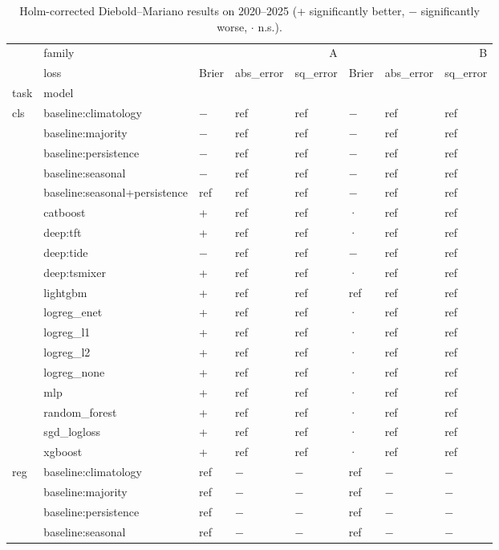 \begin{table}
\caption{Holm-corrected Diebold--Mariano results on 2020--2025 (+ significantly better, $-$ significantly worse, $\cdot$ n.s.).}
\label{tab:test_matrix}
\begin{tabular}{llllllll}
\toprule
 & family & \multicolumn{3}{r}{A} & \multicolumn{3}{r}{B} \\
 & loss & Brier & abs\_error & sq\_error & Brier & abs\_error & sq\_error \\
task & model &  &  &  &  &  &  \\
\midrule
\multirow[t]{18}{*}{cls} & baseline:climatology & − & ref & ref & − & ref & ref \\
 & baseline:majority & − & ref & ref & − & ref & ref \\
 & baseline:persistence & − & ref & ref & − & ref & ref \\
 & baseline:seasonal & − & ref & ref & − & ref & ref \\
 & baseline:seasonal+persistence & ref & ref & ref & − & ref & ref \\
 & catboost & + & ref & ref & · & ref & ref \\
 & deep:tft & + & ref & ref & · & ref & ref \\
 & deep:tide & − & ref & ref & − & ref & ref \\
 & deep:tsmixer & + & ref & ref & · & ref & ref \\
 & lightgbm & + & ref & ref & ref & ref & ref \\
 & logreg\_enet & + & ref & ref & · & ref & ref \\
 & logreg\_l1 & + & ref & ref & · & ref & ref \\
 & logreg\_l2 & + & ref & ref & · & ref & ref \\
 & logreg\_none & + & ref & ref & · & ref & ref \\
 & mlp & + & ref & ref & · & ref & ref \\
 & random\_forest & + & ref & ref & · & ref & ref \\
 & sgd\_logloss & + & ref & ref & · & ref & ref \\
 & xgboost & + & ref & ref & · & ref & ref \\
\cline{1-8}
\multirow[t]{20}{*}{reg} & baseline:climatology & ref & − & − & ref & − & − \\
 & baseline:majority & ref & − & − & ref & − & − \\
 & baseline:persistence & ref & − & − & ref & − & − \\
 & baseline:seasonal & ref & − & − & ref & − & − \\

\end{tabular}
\end{table}
